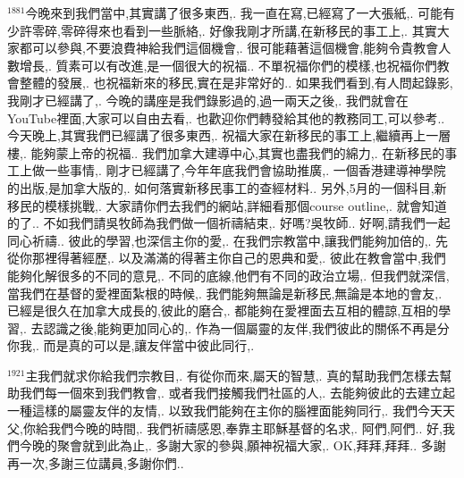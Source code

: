\documentclass{book}
\begin{document}
$^{1881}$今晚來到我們當中,其實講了很多東西,.
我一直在寫,已經寫了一大張紙,.
可能有少許零碎,零碎得來也看到一些脈絡,.
好像我剛才所講,在新移民的事工上,.
其實大家都可以參與,不要浪費神給我們這個機會,.
很可能藉著這個機會,能夠令貴教會人數增長,.
質素可以有改進,是一個很大的祝福..
不單祝福你們的模樣,也祝福你們教會整體的發展,.
也祝福新來的移民,實在是非常好的..
如果我們看到,有人問起錄影,我剛才已經講了,.
今晚的講座是我們錄影過的,過一兩天之後,.
我們就會在YouTube裡面,大家可以自由去看,.
也歡迎你們轉發給其他的教務同工,可以參考..
今天晚上,其實我們已經講了很多東西,.
祝福大家在新移民的事工上,繼續再上一層樓,.
能夠蒙上帝的祝福..
我們加拿大建導中心,其實也盡我們的綿力,.
在新移民的事工上做一些事情,.
剛才已經講了,今年年底我們會協助推廣,.
一個香港建導神學院的出版,是加拿大版的,.
如何落實新移民事工的查經材料..
另外,5月的一個科目,新移民的模樣挑戰,.
大家請你們去我們的網站,詳細看那個course outline,.
就會知道的了..
不如我們請吳牧師為我們做一個祈禱結束,.
好嗎?吳牧師..
好啊,請我們一起同心祈禱..
彼此的學習,也深信主你的愛,.
在我們宗教當中,讓我們能夠加倍的,.
先從你那裡得著經歷,.
以及滿滿的得著主你自己的恩典和愛,.
彼此在教會當中,我們能夠化解很多的不同的意見,.
不同的底線,他們有不同的政治立場,.
但我們就深信,當我們在基督的愛裡面紮根的時候,.
我們能夠無論是新移民,無論是本地的會友,.
已經是很久在加拿大成長的,彼此的磨合,.
都能夠在愛裡面去互相的體諒,互相的學習,.
去認識之後,能夠更加同心的,.
作為一個屬靈的友伴,我們彼此的關係不再是分你我,.
而是真的可以是,讓友伴當中彼此同行,.

$^{1921}$主我們就求你給我們宗教目,.
有從你而來,屬天的智慧,.
真的幫助我們怎樣去幫助我們每一個來到我們教會,.
或者我們接觸我們社區的人,.
去能夠彼此的去建立起一種這樣的屬靈友伴的友情,.
以致我們能夠在主你的腦裡面能夠同行,.
我們今天天父,你給我們今晚的時間,.
我們祈禱感恩,奉靠主耶穌基督的名求,.
阿們,阿們..
好,我們今晚的聚會就到此為止,.
多謝大家的參與,願神祝福大家,.
OK,拜拜,拜拜..
多謝再一次,多謝三位講員,多謝你們..
\newpage
\end{document}
